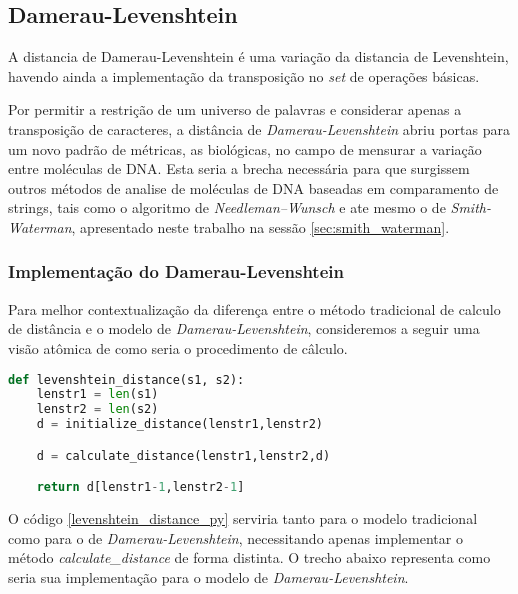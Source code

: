 \subsection{Damerau-Levenshtein} %
\label{sec:damerau_levenshtein}

A distancia de Damerau-Levenshtein é uma variação da distancia de Levenshtein\cite{levenshtein1965}, havendo ainda a implementação da transposição no \textit{set} de operações básicas.

Por permitir a restrição de um universo de palavras e considerar apenas a transposição de caracteres, a distância de \textit{Damerau-Levenshtein} abriu portas para um novo padrão de métricas, as biológicas, no campo de mensurar a variação entre moléculas de DNA. Esta seria a brecha necessária para que surgissem outros métodos de analise de moléculas de DNA baseadas em comparamento de strings, tais como o algoritmo de \textit{Needleman–Wunsch}\cite{needleman1970general} e ate mesmo o de \textit{Smith-Waterman}\cite{smith1981identification}, apresentado neste trabalho na sessão \ref{sec:smith_waterman}.

\subsubsection{Implementação do Damerau-Levenshtein} %
\label{sub:implementa_o_do_damerau_levenshtein}

Para melhor contextualização da diferença entre o método tradicional de calculo de distância e o modelo de \textit{Damerau-Levenshtein}, consideremos a seguir uma visão atômica de como seria o procedimento de câlculo.

\begin{lstlisting}[language=Python,label=levenshtein_distance_py,caption={Visão atômica do cálculo da distância de Levenshtein}]
def levenshtein_distance(s1, s2):
    lenstr1 = len(s1)
    lenstr2 = len(s2)
    d = initialize_distance(lenstr1,lenstr2)

	d = calculate_distance(lenstr1,lenstr2,d) 

    return d[lenstr1-1,lenstr2-1]
\end{lstlisting}

O código \ref{levenshtein_distance_py} serviria tanto para o modelo tradicional como para o de \textit{Damerau-Levenshtein}, necessitando apenas implementar o método \textit{calculate\_distance} de forma distinta. O trecho abaixo representa como seria sua implementação para o modelo de \textit{Damerau-Levenshtein}.

